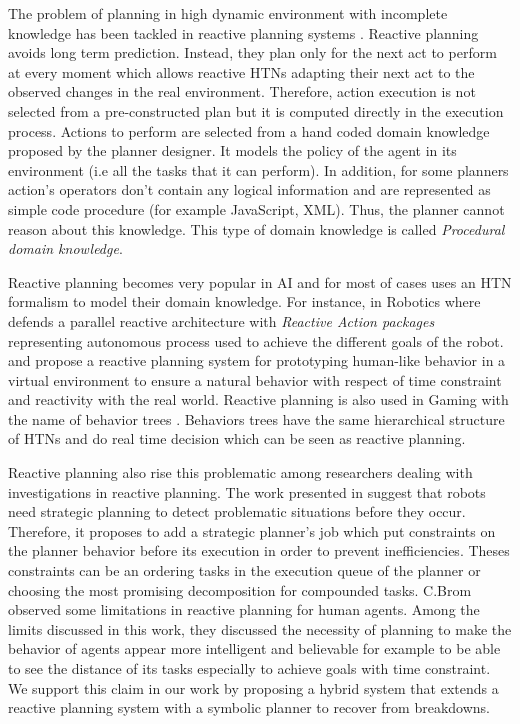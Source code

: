\documentclass[conference]{IEEEtran}
\begin{document}
	\par The problem of planning in high dynamic environment with incomplete knowledge has been tackled in reactive planning systems \cite{schoppers1987universal}.
	Reactive planning avoids long term prediction. Instead, they plan only for the next act to perform at every moment which allows reactive HTNs adapting their next act to the observed changes in the real environment. Therefore, action execution is not selected from a pre-constructed plan but it is computed directly in the execution process.
	Actions to perform are selected from a hand coded domain knowledge proposed by the planner designer. It models the policy of the agent in its environment (i.e all the tasks that it can perform). In addition, for some planners  \cite{rich2009building} action's operators don't contain any logical information and are represented as simple code procedure (for example JavaScript, XML). Thus, the planner cannot reason about this knowledge. This type of domain knowledge is called \emph{Procedural domain knowledge}.
	\par Reactive planning becomes very popular in AI and for most of cases uses an HTN formalism to model their domain knowledge. For instance, in Robotics where \cite{firby1987investigation} defends a parallel reactive architecture with \emph{Reactive Action packages} representing autonomous process used to achieve the different goals of the robot.  \cite{bryson2001intelligence} and \cite{brom2005hierarchical} propose a reactive planning system for prototyping human-like behavior in a virtual environment to ensure a natural behavior with respect of time constraint and reactivity with the real world. Reactive planning is also used in Gaming with the name of  behavior trees \cite{isla2005handling}. Behaviors trees have the same hierarchical structure of HTNs and do real time decision which can be seen as reactive planning. 
	\par Reactive planning also rise this problematic among researchers dealing with investigations in reactive planning. The work presented in  \cite{firby1987investigation} suggest that robots need strategic planning to detect problematic situations before they occur. Therefore, it proposes to add a strategic planner's job which put constraints on the planner behavior before its execution in order to prevent inefficiencies. Theses constraints can be an ordering tasks in the execution queue of the planner or choosing the most promising decomposition for compounded tasks.
		C.Brom \cite{brom2005hierarchical} observed some limitations in reactive planning for human agents. Among the limits discussed in this work, they discussed the necessity of planning to make the behavior of
		agents appear more intelligent and believable for example to be able to see the distance of its tasks especially to achieve goals with time constraint.    We support this claim in our work  by proposing a hybrid system that extends a reactive planning system with a symbolic planner to recover from breakdowns. 
		
\end{document}
